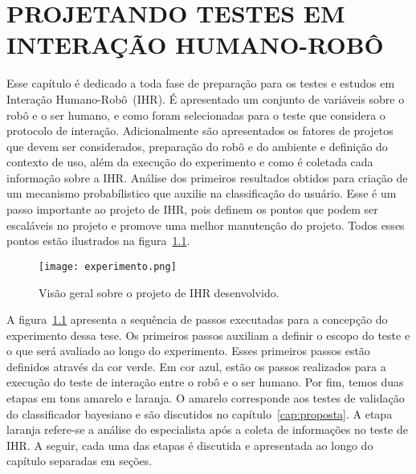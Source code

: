 \chapter{PROJETANDO TESTES EM INTERAÇÃO HUMANO-ROBÔ}
\label{cap:projetoihr}
Esse capítulo é dedicado a toda fase de preparação para os testes e estudos em Interação Humano-Robô~(IHR). É apresentado um conjunto de variáveis sobre o robô e o ser humano, e como foram selecionadas para o teste que considera o protocolo de interação. Adicionalmente são apresentados os fatores de projetos que devem ser considerados, preparação do robô e do ambiente e definição do contexto de uso, além da execução do experimento e como é coletada cada informação sobre a IHR. Análise dos primeiros resultados obtidos para criação de um mecanismo probabílistico que auxilie na classificação do usuário. Esse é um passo importante ao projeto de IHR, pois definem os pontos que podem ser escaláveis no projeto e promove uma melhor manutenção do projeto. Todos esses pontos estão ilustrados na figura~\ref{fig:experimento}.

\begin{figure}[ht!]
	\centering
	\begin{minipage}{\textwidth}
		\caption{Visão geral sobre o projeto de IHR desenvolvido.}
		\texttt{[image: experimento.png]}
		\label{fig:experimento}
	\end{minipage}
\end{figure}

A figura~\ref{fig:experimento} apresenta a sequência de passos executadas para a concepção do experimento dessa tese. Os primeiros passos auxiliam a definir o escopo do teste e o que será avaliado ao longo do experimento. Esses primeiros passos estão definidos através da cor verde. Em cor azul, estão os passos realizados para a execução do teste de interação entre o robô e o ser humano. Por fim, temos duas etapas em tons amarelo e laranja. O amarelo corresponde aos testes de validação do classificador bayesiano e são discutidos no capítulo~\ref{cap:proposta}. A etapa laranja refere-se a análise do especialista após a coleta de informações no teste de IHR. A seguir, cada uma das etapas é discutida e apresentada ao longo do capítulo separadas em seções.

